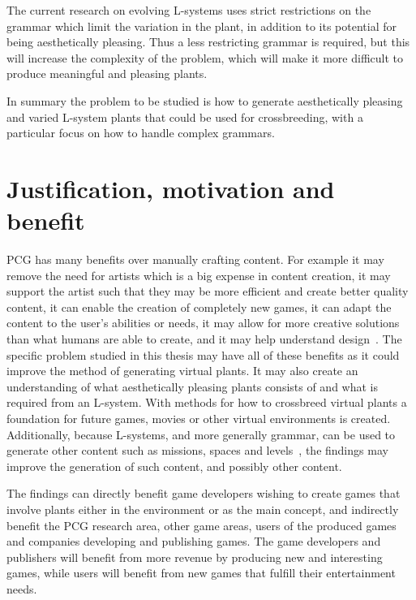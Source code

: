 The current research on evolving \glspl{L-system} uses strict restrictions on the grammar which limit the variation in the plant, in addition to its potential for being aesthetically pleasing. %
Thus a less restricting grammar is required, but this will increase the complexity of the problem, which will make it more difficult to produce meaningful and pleasing plants.

In summary the problem to be studied is how to generate aesthetically pleasing and varied \gls{L-system} plants that could be used for crossbreeding, with a particular focus on how to handle complex grammars.

\section{Justification, motivation and benefit}
\gls{PCG} has many benefits over manually crafting content.
For example it may remove the need for artists which is a big expense in content creation, it may support the artist such that they may be more efficient and create better quality content, it can enable the creation of completely new games, it can adapt the content to the user's abilities or needs, it may allow for more creative solutions than what humans are able to create, and it may help understand design~\cite{PCG_1}.
The specific problem studied in this thesis may have all of these benefits as it could improve the method of generating virtual plants.
It may also create an understanding of what aesthetically pleasing plants consists of and what is required from an \gls{L-system}.
With methods for how to crossbreed virtual plants a foundation for future games, movies or other virtual environments is created.
Additionally, because \glspl{L-system}, and more generally grammar, can be used to generate other content such as missions, spaces and levels~\cite{PCG_5}, the findings may improve the generation of such content, and possibly other content.

The findings can directly benefit game developers wishing to create games that involve plants either in the environment or as the main concept, and indirectly benefit the \gls{PCG} research area, other game areas, users of the produced games and companies developing and publishing games.
The game developers and publishers will benefit from more revenue by producing new and interesting games, while users will benefit from new games that fulfill their entertainment needs.

